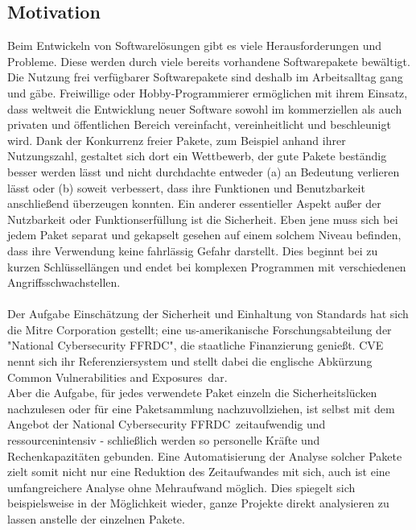 \subsection{Motivation} \label{subsec:Motivation}
    Beim Entwickeln von Softwarelösungen gibt es viele Herausforderungen und Probleme. 
    Diese werden durch viele bereits vorhandene Softwarepakete bewältigt.
    Die Nutzung frei verfügbarer Softwarepakete sind deshalb im Arbeitsalltag gang und gäbe.
    Freiwillige oder Hobby-Programmierer ermöglichen mit ihrem Einsatz, dass weltweit die Entwicklung neuer Software sowohl im kommerziellen als auch privaten und öffentlichen Bereich vereinfacht, vereinheitlicht und beschleunigt wird.
    Dank der Konkurrenz freier Pakete, zum Beispiel anhand ihrer Nutzungszahl, gestaltet sich dort ein Wettbewerb, der gute Pakete beständig besser werden lässt und nicht durchdachte entweder (a) an Bedeutung verlieren lässt oder (b) soweit verbessert, dass ihre Funktionen und Benutzbarkeit anschließend überzeugen konnten.
    Ein anderer essentieller Aspekt außer der Nutzbarkeit oder Funktionserfüllung ist die Sicherheit.
    Eben jene muss sich bei jedem Paket separat und gekapselt gesehen auf einem solchem Niveau befinden, dass ihre Verwendung keine fahrlässig Gefahr darstellt.
    Dies beginnt bei zu kurzen Schlüssellängen und endet bei komplexen Programmen mit verschiedenen Angriffsschwachstellen.
    \\ \\
    Der Aufgabe Einschätzung der Sicherheit und Einhaltung von Standards hat sich die Mitre Corporation gestellt; eine us-amerikanische Forschungsabteilung der "National Cybersecurity FFRDC", die staatliche Finanzierung genießt.
    CVE nennt sich ihr Referenziersystem und stellt dabei die englische Abkürzung \glqq Common Vulnerabilities and Exposures\grqq~dar.
    \\
    Aber die Aufgabe, für jedes verwendete Paket einzeln die Sicherheitslücken nachzulesen oder für eine Paketsammlung nachzuvollziehen, ist selbst mit dem Angebot der \glqq National Cybersecurity FFRDC\grqq~zeitaufwendig und ressourcenintensiv - schließlich werden so personelle Kräfte und Rechenkapazitäten gebunden.
    Eine Automatisierung der Analyse solcher Pakete zielt somit nicht nur eine Reduktion des Zeitaufwandes mit sich, auch ist eine umfangreichere Analyse ohne Mehraufwand möglich.
    Dies spiegelt sich beispielsweise in der Möglichkeit wieder, ganze Projekte direkt analysieren zu lassen anstelle der einzelnen Pakete.
    \\
